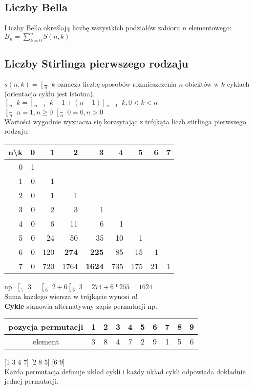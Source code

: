 \documentclass[a4paper,12pt]{article}
\DeclareRobustCommand{\stirling}{\genfrac [ ] {0pt}{}} %
\begin{document}
\subsection{Liczby Bella}
Liczby Bella określają liczbę wszystkich podziałów zabioru $n$ elementowego: $B_n=\sum^n_{k=0}S(n,k)$
\subsection{Liczby Stirlinga pierwszego rodzaju}
$s(n,k)=\stirling{n}{k}$ oznacza liczbę sposobów rozmieszczenia $n$ obiektów w $k$ cyklach (orientacja cyklu jest istotna). \\
$\stirling{n}{k}=\stirling{n-1}{k-1}+(n-1)\stirling{n-1}{k}, 0<k<n$ \\
$\stirling{n}{n}=1, n\geq0$ $\stirling{n}{0}=0, n>0$ \\
Wartości wygodnie wyznacza się korzsytając z trójkąta liczb stirlinga pierwszego rodzaju:\\
\begin{tabular}{|r|r|r|r|r|r|r|r|r|} 
 \hline
 n\textbackslash k & 0 & 1 & 2 & 3 & 4 & 5 & 6 & 7\\ \hline
 0&1&&&&&&& \\ \hline
 1&0&1&&&&&&\\ \hline
 2&0&1&1&&&&&\\ \hline
 3&0&2&3&1&&&&\\ \hline
 4&0&6&11&6&1&&&\\ \hline
 5&0&24&50&35&10&1&&\\ \hline
 6&0&120&\textbf{274}&\textbf{225}&85&15&1&\\ \hline
 7&0&720&1764&\textbf{1624}&735&175&21&1\\ \hline
\end{tabular}
np. $\stirling{7}{3}=\stirling{6}{2}+6\stirling{6}{3}=274+6*255=1624$ \\
Suma każdego wiersza w trójkącie wynosi $n!$ \\
\textbf{Cykle} stanowią alternatywny zapis permutacji np.\\
\begin{tabular}{c|c|c|c|c|c|c|c|c|c}
 pozycja permutacji &1 & 2& 3& 4&5&6&7&8&9\\ \hline
 element & 3 & 8 &4 &7 &2 &9 &1 & 5 &6 \\
\end{tabular}
[1 3 4 7] [2 8 5] [6 9] \\
Każda permutacja definuje układ cykli i każdy układ cykli odpowiada dokładnie jednej permutacji.
\end{document}

